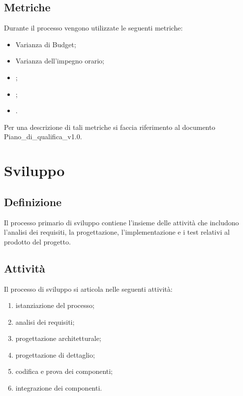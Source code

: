 \subsection{Metriche}
Durante il processo vengono utilizzate le seguenti metriche:
\begin{itemize}
    \item Varianza di Budget;
    \item Varianza dell'impegno orario;
    \item {};
    \item {};
    \item {}.
\end{itemize}
Per una descrizione di tali metriche si faccia riferimento al documento Piano\_di\_qualifica\_v1.0.

\newpage

\section{Sviluppo} \label{sec:sviluppo}
\subsection{Definizione}
Il processo primario di sviluppo contiene l'insieme delle attività che includono l'analisi dei requisiti, la progettazione, l'implementazione e i test relativi al prodotto del progetto.

\subsection{Attività}
Il processo di sviluppo si articola nelle seguenti attività:
\begin{enumerate}
    \item istanziazione del processo;
    \item analisi dei requisiti;
    \item progettazione architetturale;
    \item progettazione di dettaglio;
    \item codifica e prova dei componenti;
    \item integrazione dei componenti.
\end{enumerate}
